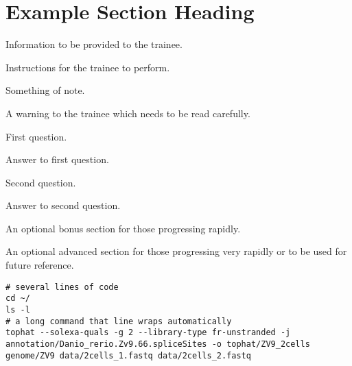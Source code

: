 \documentclass[a4paper,12pt,twoside]{memoir}
\begin{document}
%
%
\workshoptitlepage

\section{Example Section Heading}

\begin{information}
Information to be provided to the trainee.
\end{information}

\begin{steps}
Instructions for the trainee to perform.
\end{steps}

\begin{note}
Something of note.
\end{note}

\begin{warning}
A warning to the trainee which needs to be read carefully.
\end{warning}

\begin{questions}
First question.
\begin{answer}
Answer to first question.
\end{answer}

Second question.
\begin{answer}
Answer to second question.
\end{answer}
\end{questions}

\begin{bonus}
An optional bonus section for those progressing rapidly.
\end{bonus}

\begin{advanced}
An optional advanced section for those progressing very rapidly or to be used for future reference.
\end{advanced}

\begin{lstlisting}
# several lines of code
cd ~/
ls -l
# a long command that line wraps automatically
tophat --solexa-quals -g 2 --library-type fr-unstranded -j annotation/Danio_rerio.Zv9.66.spliceSites -o tophat/ZV9_2cells genome/ZV9 data/2cells_1.fastq data/2cells_2.fastq
\end{lstlisting}
\end{document}
